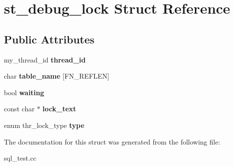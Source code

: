 \hypertarget{structst__debug__lock}{}\section{st\+\_\+debug\+\_\+lock Struct Reference}
\label{structst__debug__lock}
\subsection*{Public Attributes}
\begin{DoxyCompactItemize}
\item 
\mbox{\label{structst__debug__lock_ac324b385808e313b6c18cae1a4588253}} 
my\+\_\+thread\+\_\+id {\bfseries thread\+\_\+id}
\item 
\mbox{\label{structst__debug__lock_af4dbf2d7cbe1a413f19741a5cadba6f3}} 
char {\bfseries table\+\_\+name} \mbox{[}F\+N\+\_\+\+R\+E\+F\+L\+EN\mbox{]}
\item 
\mbox{\label{structst__debug__lock_af7c80375cdb37c0787d8e8335b5941e8}} 
bool {\bfseries waiting}
\item 
\mbox{\label{structst__debug__lock_a154f16a0f092468ce359f9288d0643f2}} 
const char $\ast$ {\bfseries lock\+\_\+text}
\item 
\mbox{\label{structst__debug__lock_a256eaecdd09c144d615abd458631ced7}} 
enum thr\+\_\+lock\+\_\+type {\bfseries type}
\end{DoxyCompactItemize}


The documentation for this struct was generated from the following file\+:\begin{DoxyCompactItemize}
\item 
sql\+\_\+test.\+cc\end{DoxyCompactItemize}

